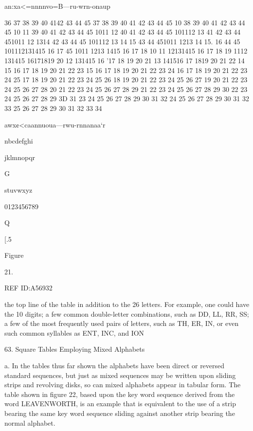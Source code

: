 {an:xa<=nnnnvo=B—ru-wrn-onaup

36 37 38 39 40 4142 43 44 45
37 38 39 40 41 42 43 44 45 10
38 39 40 41 42 43 44 45 10 11
39 40 41 42 43 44 45 1011 12
40 41 42 43 44 45 101112 13
41 42 43 44 451011 12 1314
42 43 44 45 101112 13 14 15
43 44 451011 1213 14 15. 16
44 45 101112131415 16 17
45 1011 1213 1415 16 17 18
10 11 12131415 16 17 18 19
1112 131415 16171819 20
12 131415 16 '17 18 19 20 21
13 141516 17 1819 20 21 22
14 15 16 17 18 19 20 21 22 23
15 16 17 18 19 20 21 22 23 24
16 17 18 19 20 21 22 23 24 25
17 18 19 20 21 22 23 24 25 26
18 19 20 21 22 23 24 25 26 27
19 20 21 22 23 24 25 26 27 28
20 21 22 23 24 25 26 27 28 29
21 22 23 24 25 26 27 28 29 30
22 23 24 25 26 27 28 29 3D 31
23 24 25 26 27 28 29 30 31 32
24 25 26 27 28 29 30 31 32 33
25 26 27 28 29 30 31 32 33 34

awx¢<caannuoua—rwu-rnnanaa‘r

 

 

 

nbcdefghi

 

 

jklmnopqr

 

G

 

 

stuvwxyz

 

0123456789

 

Q

 

 

[.5

Figure

21.

 

 

 

REF ID:A56932

the top line of the table in addition to the 26 letters. For example, one
could have the 10 digits; a few common double-letter combinations, such
as DD, LL, RR, SS; a few of the most frequently used pairs of letters,
such as TH, ER, IN, or even such common syllables as ENT, INC, and
ION

63. Square Tables Employing Mixed Alphabets

a. In the tables thus far shown the alphabets have been direct or
reversed standard sequences, but just as mixed sequences may be written
upon sliding strips and revolving disks, so can mixed alphabets appear in
tabular form. The table shown in ﬁgure 22, based upon the key word
sequence derived from the word LEAVENWORTH, is an example that
is equivalent to the use of a strip bearing the same key word sequence
sliding against another strip bearing the normal alphabet.

}
